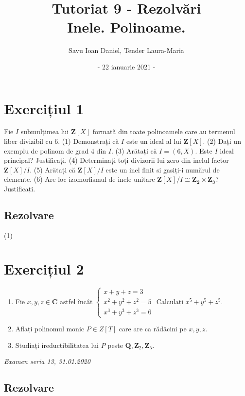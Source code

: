 \documentclass{article}
\title{Tutoriat 9 - Rezolvări \\
\Large  Inele. Polinoame. }
\date{- 22 ianuarie 2021 -}
\author{Savu Ioan Daniel, Tender Laura-Maria}
\begin{document}
\maketitle
\section{Exercițiul 1}
Fie $I$ submulțimea lui $\mathbf{Z}[X]$ formată din toate polinoamele care au termenul liber divizibil cu 6.
\newline
(1) Demonstrați că $I$ este un ideal al lui $\mathbf{Z}[X]$.
\newline
(2) Dați un exemplu de polinom de grad 4 din $I$.
\newline
(3) Arătați că $I=(6,X)$. Este $I$ ideal principal? Justificați.
\newline
(4) Determinați toți divizorii lui zero din inelul factor $\mathbf{Z}[X]/I$.
\newline
(5) Arătați că $\mathbf{Z}[X]/I$ este un inel finit si gasiți-i numărul de elemente. 
\newline
(6) Are loc izomorfismul de inele unitare $\mathbf{Z}[X]/I \cong \mathbf{Z_2} \times \mathbf{Z_3}$? Justificați. 
\subsection{Rezolvare}
(1) 


\section{Exercițiul 2}
\begin{enumerate}
    \item Fie $x, y, z \in \mathbf{C}$ astfel încât
    $\begin{cases} 
    x + y + z = 3 \\ 
   x^2 + y^2 + z^2 = 5 \\ 
    x^3 + y^3 + z^3 = 6
    \end{cases}$ \newline
    Calculați $x^5 + y^5 + z^5$.
    \item Aflați polinomul monic $P \in Z[T]$ care are ca rădăcini pe $x, y, z$.
    \item Studiați ireductibilitatea lui $P$ peste $\mathbf{Q}, \mathbf{Z}_2, \mathbf{Z}_5$.
\end{enumerate}
\emph{Examen seria 13, 31.01.2020}

\subsection{Rezolvare}
\end{document}
